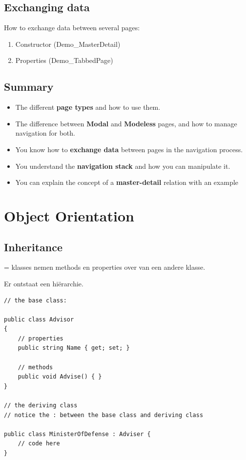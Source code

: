 \documentclass{article}
\newcommand{\bold}[1]{\textbf{#1}}
\begin{document}
\subsection{Exchanging data}

How to exchange data between several pages:

\begin{enumerate}
    \item Constructor (Demo\_MasterDetail)
    \item Properties (Demo\_TabbedPage)
\end{enumerate}

\subsection{Summary}

\begin{itemize}
    \item The different \bold{page types} and how to use them.
    \item The difference between \bold{Modal} and \bold{Modeless} pages, and how to manage navigation for both.
    \item You know how to \bold{exchange data} between pages in the navigation process.
    \item You understand the \bold{navigation stack} and how you can manipulate it.
    \item You can explain the concept of a \bold{master-detail} relation with an example
\end{itemize}

\section{Object Orientation}

\subsection{Inheritance}

= klasses nemen methods en properties over van een andere klasse. 

Er ontstaat een hi\"erarchie.

\begin{verbatim}
// the base class: 

public class Advisor
{
    // properties
    public string Name { get; set; }

    // methods
    public void Advise() { }
}

// the deriving class
// notice the : between the base class and deriving class

public class MinisterOfDefense : Adviser {
    // code here
}

\end{verbatim}
\end{document}
